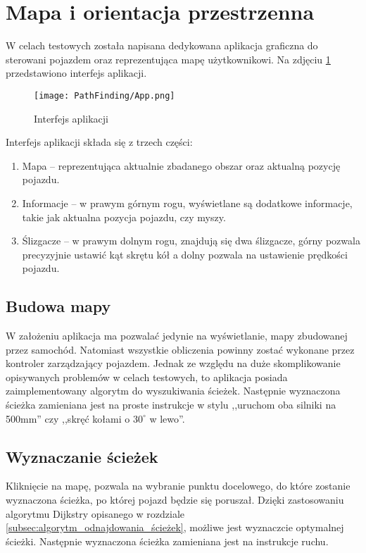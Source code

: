 \section{Mapa i orientacja przestrzenna}
    W celach testowych została napisana dedykowana aplikacja graficzna do sterowani pojazdem oraz reprezentująca mapę użytkownikowi.
    Na zdjęciu \ref{fig:app} przedstawiono interfejs aplikacji.
    \begin{figure}[!ht]
        \centering
        \texttt{[image: PathFinding/App.png]}
        \caption{Interfejs aplikacji}
        \label{fig:app}
    \end{figure}
    Interfejs aplikacji składa się z trzech części:
    \begin{enumerate}
        \item Mapa -- reprezentująca aktualnie zbadanego obszar oraz aktualną pozycję pojazdu.
        \item Informacje -- w prawym górnym rogu, wyświetlane są dodatkowe informacje, takie jak aktualna pozycja pojazdu, czy myszy.
        \item Ślizgacze -- w prawym dolnym rogu, znajdują się dwa ślizgacze, górny pozwala precyzyjnie ustawić kąt skrętu kół a dolny pozwala na ustawienie prędkości pojazdu.
    \end{enumerate}

    \subsection{Budowa mapy}
        W założeniu aplikacja ma pozwalać jedynie na wyświetlanie, mapy zbudowanej przez samochód.
        Natomiast wszystkie obliczenia powinny zostać wykonane przez kontroler zarządzający pojazdem.
        Jednak ze względu na duże skomplikowanie opisywanych problemów w celach testowych, to aplikacja posiada zaimplementowany algorytm do wyszukiwania ścieżek.
        Następnie wyznaczona ścieżka zamieniana jest na proste instrukcje w stylu ,,uruchom oba silniki na 500mm'' czy ,,skręć kołami o $30^\circ$ w lewo''.




    \subsection{Wyznaczanie ścieżek}
        Kliknięcie na mapę, pozwala na wybranie punktu docelowego, do które zostanie wyznaczona ścieżka, po której pojazd będzie się poruszał.
        Dzięki zastosowaniu algorytmu Dijkstry opisanego w rozdziale \ref{subsec:algorytm_odnajdowania_ścieżek}, możliwe jest wyznaczcie optymalnej ścieżki.
        Następnie wyznaczona ścieżka zamieniana jest na instrukcje ruchu.

